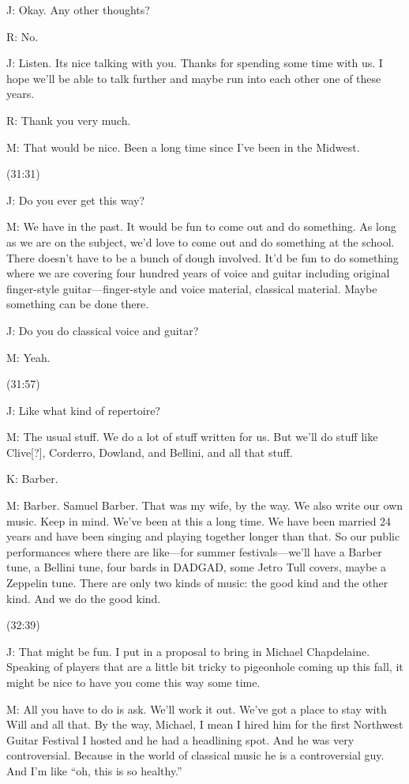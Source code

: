 \documentclass[11pt]{article}
\begin{document}
J: Okay. Any other thoughts?

R: No. 

J: Listen. Its nice talking with you. Thanks for spending some time with us. I hope we'll be able to talk further and maybe run into each other one of these years.

R: Thank you very much.

M: That would be nice. Been a long time since I've been in the Midwest.

(31:31)

J: Do you ever get this way? 

M: We have in the past. It would be fun to come out and do something. As long as we are on the subject, we'd love to come out and do something at the school. There doesn't have to be a bunch of dough involved. It'd be fun to do something where we are covering four hundred years of voice and guitar including original finger-style guitar—finger-style and voice material, classical material. Maybe something can be done there.

J: Do you do classical voice and guitar?

M: Yeah.

(31:57) 

J: Like what kind of repertoire?

M: The usual stuff. We do a lot of stuff written for us. But we'll do stuff like Clive[?], Corderro, Dowland, and Bellini, and all that stuff.

K: Barber.

M: Barber. Samuel Barber. That was my wife, by the way. We also write our own music. Keep in mind. We've been at this a long time. We have been married 24 years and have been singing and playing together longer than that. So our public performances where there are like—for summer festivals—we'll have a Barber tune, a Bellini tune, four bards in DADGAD, some Jetro Tull covers, maybe a Zeppelin tune. There are only two kinds of music: the good kind and the other kind. And we do the good kind. 

(32:39)

J: That might be fun. I put in a proposal to bring in Michael Chapdelaine. Speaking of players that are a little bit tricky to pigeonhole coming up this fall, it might be nice to have you come this way some time. 

M: All you have to do is ask. We'll work it out. We've got a place to stay with Will and all that. By the way, Michael, I mean I hired him for the first Northwest Guitar Festival I hosted and he had a headlining spot. And he was very controversial. Because in the world of classical music he is a controversial guy. And I'm like ``oh, this is so healthy.''
\end{document}
